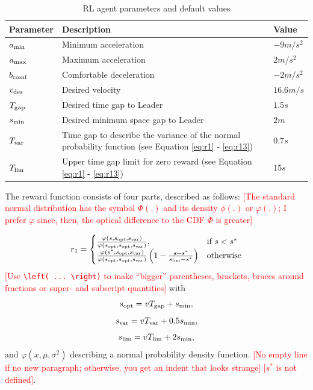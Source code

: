 \documentclass[review]{elsarticle}
\providecommand{\red}[1]{\textcolor{red}{#1}}
\providecommand{\martin}[1]{\red{#1}} %
\begin{document}
\begin{table}
\caption{RL agent parameters and default values} 
\label{tab:agentParameters} 
\begin{center}
\begin{tabular}{ p{}| p{}| p{}}
	Parameter & Description & Value \\ \hline
	$a_{\rm min}$ & Minimum acceleration & $-9m/s^2$ \\  
	$a_{\rm max}$ & Maximum acceleration & $2m/s^2$ \\  
	$b_{\rm comf}$ & Comfortable deceleration & $-2m/s^2$ \\  
	$v_{\rm des}$ & Desired velocity & $16.6 m/s$ \\  		
	$T_{\rm gap}$ & Desired time gap to Leader & $1.5s$ \\
	$s_{\rm min}$ & Desired minimum space gap to Leader & $2m$ \\
	$T_{\rm var}$ & Time gap to describe the variance of the normal probability function (see Equation \ref{eq:r1} - \ref{eq:r13}) & $0.7s$ \\
	$T_{\rm lim}$ & Upper time gap limit for zero reward (see Equation \ref{eq:r1} - \ref{eq:r13}) & $15s$ 
\end{tabular}
\end{center}
\end{table}


The reward function consists of four parts, described as follows:
\martin{[The standard normal distribution has the symbol $\Phi(.)$ and
    its density $\phi(.)$ or $\varphi(.)$; I prefer $\varphi$ since, then,
    the optical difference to the CDF $\Phi$ is greater]}

\begin{equation}
\label{eq:r1}
r_1  = 
\begin{cases}
\frac{\varphi(s,  s_{\rm opt},  s_{\rm var})}{\varphi( s_{\rm opt},  s_{\rm opt},  s_{\rm var})},& \text{if } s < s^*\\
\frac{\varphi(s^*,  s_{\rm opt},  s_{\rm var})}{\varphi( s_{\rm opt},  s_{\rm opt},  s_{\rm var})} \left(1-\frac{s-s^*}{s_{\rm lim} - s^*}\right)              & \text{otherwise}
\end{cases}
\end{equation}
\martin{[Use \texttt{\textbackslash left( ... \textbackslash right)}
    to make ``bigger'' parentheses, brackets, braces around fractions
    or super- and subscript quantities]}
with
\begin{equation}
\label{eq:r11}
s_{\rm opt} = vT_{\rm gap} + s_{\rm min},
\end{equation}
\begin{equation}
\label{eq:r12}
s_{\rm var} = vT_{\rm var} + 0.5s_{\rm min},
\end{equation}
\begin{equation}
\label{eq:r13}
s_{\rm lim} = vT_{\rm lim} + 2s_{\rm min},
\end{equation}
%
and $\varphi(x,\mu,\sigma^2)$ describing a normal probability density
function. \martin{[No empty line if no new paragraph; otherwise, you get an
  indent that looks strange] [$s^*$ is not defined]}.
\end{document}
